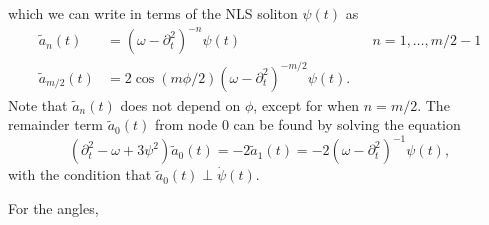 \documentclass[11pt,reqno]{amsart}
\begin{document}
which we can write in terms of the NLS soliton $\psi(t)$ as
\begin{equation}
\begin{aligned}
\tilde{a}_n(t) &= (\omega - \partial_t^2)^{-n} \psi(t) && n = 1, \dots, m/2-1 \\
\tilde{a}_{m/2}(t) &= 2 \cos( m\phi/2)(\omega - \partial_t^2)^{-m/2} \psi(t).
\end{aligned}
\end{equation}
Note that $\tilde{a}_n(t)$ does not depend on $\phi$, except for when $n=m/2$. The remainder term $\tilde{a}_0(t)$ from node 0 can be found by solving the equation
\begin{equation}\label{eq:tildea0eq}
\left( \partial_t^2 - \omega + 3 \psi^2 \right) \tilde{a}_0(t) = -2 \tilde{a}_1(t) =
-2 (\omega - \partial_t^2)^{-1} \psi(t),
\end{equation}
with the condition that $\tilde{a}_0(t) \perp \dot \psi(t)$.

For the angles, 
\end{document}
